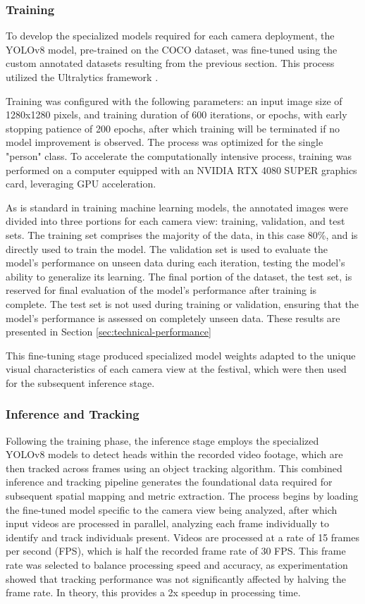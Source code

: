 \subsubsection{Training}
To develop the specialized models required for each camera deployment, the YOLOv8 model, pre-trained on the COCO dataset, was fine-tuned using the custom annotated datasets resulting from the previous section. This process utilized the Ultralytics framework \cite{ultralytics}.

Training was configured with the following parameters: an input image size of 1280x1280 pixels, and training duration of 600 iterations, or epochs, with early stopping patience of 200 epochs, after which training will be terminated if no model improvement is observed. The process was optimized for the single "person" class. To accelerate the computationally intensive process, training was performed on a computer equipped with an NVIDIA RTX 4080 SUPER graphics card, leveraging GPU acceleration.

As is standard in training machine learning models, the annotated images were divided into three portions for each camera view: training, validation, and test sets. The training set comprises the majority of the data, in this case 80\%, and is directly used to train the model. The validation set is used to evaluate the model's performance on unseen data during each iteration, testing the model's ability to generalize its learning. The final portion of the dataset, the test set, is reserved for final evaluation of the model's performance after training is complete. The test set is not used during training or validation, ensuring that the model's performance is assessed on completely unseen data. These results are presented in Section \ref{sec:technical-performance}

This fine-tuning stage produced specialized model weights adapted to the unique visual characteristics of each camera view at the festival, which were then used for the subsequent inference stage.

\subsubsection{Inference and Tracking}
Following the training phase, the inference stage employs the specialized YOLOv8 models to detect heads within the recorded video footage, which are then tracked across frames using an object tracking algorithm. This combined inference and tracking pipeline generates the foundational data required for subsequent spatial mapping and metric extraction. The process begins by loading the fine-tuned model specific to the camera view being analyzed, after which input videos are processed in parallel, analyzing each frame individually to identify and track individuals present. Videos are processed at a rate of 15 frames per second (FPS), which is half the recorded frame rate of 30 FPS. This frame rate was selected to balance processing speed and accuracy, as experimentation showed that tracking performance was not significantly affected by halving the frame rate. In theory, this provides a 2x speedup in processing time.

